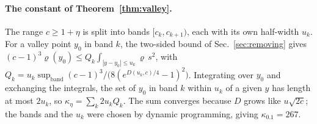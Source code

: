 \paragraph*{The constant of Theorem~\ref{thm:valley}.} The range $c \geq 1 + \eta$ is split into bands $[c_k, c_{k+1})$, each with its own half-width $u_k$. For a valley point $y_0$ in band $k$, the two-sided bound of Sec.~\ref{sec:removing} gives $(c - 1)^3\varrho(y_0) \leq Q_k\int_{|y - y_0| \leq u_k}\varrho\,s^2$, with $Q_k = u_k\sup_{\text{band}}(c-1)^3/\big(8(e^{D(u_k,c)/4} - 1)^2\big)$. Integrating over $y_0$ and exchanging the integrals, the set of $y_0$ in band $k$ within $u_k$ of a given $y$ has length at most $2u_k$, so $\kappa_\eta = \sum_k 2u_kQ_k$. The sum converges because $D$ grows like $u\sqrt{2c}$; the bands and the $u_k$ were chosen by dynamic programming, giving $\kappa_{0.1} = 267$.
